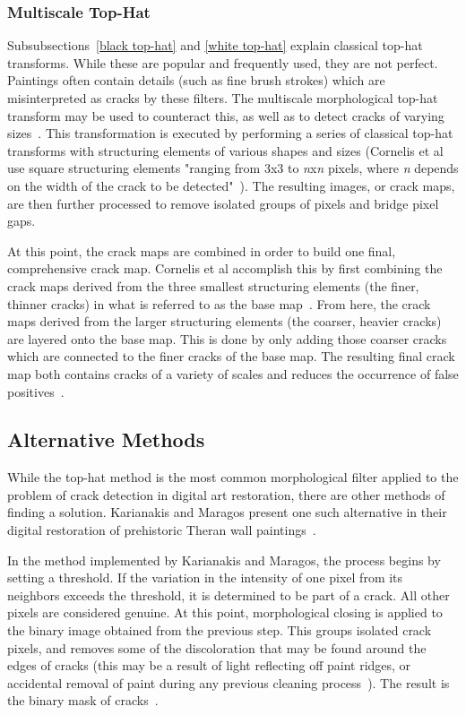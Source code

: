 \documentclass{sig-alternate}
\begin{document}
\subsubsection{Multiscale Top-Hat}\label{multiscale top-hat}
Subsubsections~\ref{black top-hat} and \ref{white top-hat} explain classical top-hat transforms. While these are popular and frequently used, they are not perfect. Paintings often contain details (such as fine brush strokes) which are misinterpreted as cracks by these filters. The multiscale morphological top-hat transform may be used to counteract this, as well as to detect cracks of varying sizes~\cite{Altarpiece:2013}. This transformation is executed by performing a series of classical top-hat transforms with structuring elements of various shapes and sizes (Cornelis et al use square structuring elements "ranging from 3x3 to \textit{n}x\textit{n} pixels, where \textit{n} depends on the width of the crack to be detected"~\cite{Altarpiece:2013}). The resulting images, or crack maps, are then further processed to remove isolated groups of pixels and bridge pixel gaps.

At this point, the crack maps are combined in order to build one final, comprehensive crack map. Cornelis et al accomplish this by first combining the crack maps derived from the three smallest structuring elements (the finer, thinner cracks) in what is referred to as the base map~\cite{Altarpiece:2013}. From here, the crack maps derived from the larger structuring elements (the coarser, heavier cracks) are layered onto the base map. This is done by only adding those coarser cracks which are connected to the finer cracks of the base map. The resulting final crack map both contains cracks of a variety of scales and reduces the occurrence of false positives~\cite{Altarpiece:2013}.

\subsection{Alternative Methods}\label{alternative}
While the top-hat method is the most common morphological filter applied to the problem of crack detection in digital art restoration, there are other methods of finding a solution. Karianakis and Maragos present one such alternative in their digital restoration of prehistoric Theran wall paintings~\cite{Theran:2013}.

In the method implemented by Karianakis and Maragos, the process begins by setting a threshold. If the variation in the intensity of one pixel from its neighbors exceeds the threshold, it is determined to be part of a crack. All other pixels are considered genuine. At this point, morphological closing is applied to the binary image obtained from the previous step. This groups isolated crack pixels, and removes some of the discoloration that may be found around the edges of cracks (this may be a result of light reflecting off paint ridges, or accidental removal of paint during any previous cleaning process~\cite{Altarpiece:2013}). The result is the binary mask of cracks~\cite{Theran:2013}.
\end{document}
